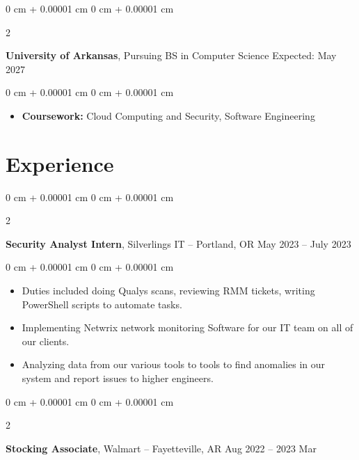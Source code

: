 \documentclass[10pt, letterpaper]{article}
\newenvironment{highlights}{
    \begin{itemize}[
        topsep=0.10 cm,
        parsep=0.10 cm,
        partopsep=0pt,
        itemsep=0pt,
        leftmargin=0 cm + 10pt
    ]
}{
    \end{itemize}
} %
\newenvironment{onecolentry}{
    \begin{adjustwidth}{
        0 cm + 0.00001 cm
    }{
        0 cm + 0.00001 cm
    }
}{
    \end{adjustwidth}
} %
\newenvironment{twocolentry}[2][]{
    \onecolentry
    \def\secondColumn{#2}
    \setcolumnwidth{\fill, 4.5 cm}
    \begin{paracol}{2}
}{
    \switchcolumn \raggedleft \secondColumn
    \end{paracol}
    \endonecolentry
} %
\begin{document}
        
        \begin{twocolentry}{
            Expected: May 2027
          }
            \textbf{University of Arkansas}, Pursuing BS in Computer Science\end{twocolentry}

        \vspace{0.10 cm}
        \begin{onecolentry}
            \begin{highlights}
                \item \textbf{Coursework:} Cloud Computing and Security, Software Engineering
            \end{highlights}
        \end{onecolentry}



    
    \section{Experience}



        
        \begin{twocolentry}{
            May 2023 – July 2023
        }
            \textbf{Security Analyst Intern}, Silverlings IT -- Portland, OR\end{twocolentry}

        \vspace{0.10 cm}
        \begin{onecolentry}
            \begin{highlights}
                \item Duties included doing Qualys scans, reviewing RMM tickets, writing PowerShell scripts to automate tasks.
                \item Implementing Netwrix network monitoring Software for our IT team on all of our clients.
                \item Analyzing data from our various tools to tools to find anomalies in our system and report issues to higher engineers.
            \end{highlights}
        \end{onecolentry}

        \vspace{0.1 cm}

        \begin{twocolentry}{
            Aug 2022 –  2023 Mar
        }
            \textbf{Stocking Associate}, Walmart -- Fayetteville, AR\end{twocolentry}
\end{document}
